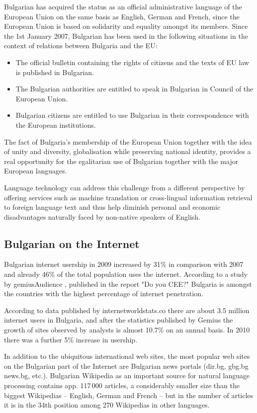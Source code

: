 \begin{multicols}{2}
Bulgarian has acquired the status as an official administrative language of the European Union on the same basis as English, German and French, since the European Union is based on solidarity and equality amongst its members. Since the 1st January 2007, Bulgarian has been used in the following situations in the context of relations between Bulgaria and the EU:
\begin{itemize}
\item The official bulletin containing the rights of citizens and the texts of EU law is published in Bulgarian.
\item The Bulgarian authorities are entitled to speak in Bulgarian in Council of the European Union.
\item Bulgarian citizens are entitled to use Bulgarian in their correspondence with the European institutions.
\end{itemize}

The fact of Bulgaria’s membership of the European Union together with the idea of unity and diversity, globalisation while preserving national identity, provides a real opportunity for the egalitarian use of Bulgarian together with the major European languages.

Language technology can address this challenge from a different perspective by offering services such as machine translation or cross-lingual information retrieval to foreign language text and thus help diminish personal and economic disadvantages naturally faced by non-native speakers of English.

\subsection{Bulgarian on the Internet}

Bulgarian internet usership in 2009 increased by 31\% in comparison with 2007 and already 46\% of the total population uses the internet. According to a study by gemiusAudience \cite{gemius}, published in the report "Do you CEE?" \cite{inetcee} Bulgaria is amongst the countries with the highest percentage of internet penetration.

According to data published by internetworldstats.co \cite{inetworldstat} there are about 3.5 million internet users in Bulgaria, and after the statistics published by Gemius the growth of sites observed by analysts is almost 10.7\% on an annual basis. In 2010 there was a further 5\% increase in usership.

In addition to the ubiquitous international web sites, the most popular web sites on the Bulgarian part of the Internet are Bulgarian news portals (dir.bg, gbg.bg news.bg, etc.). Bulgarian Wikipedia as an important source for natural language processing contains app. 117\,000 articles, a considerably smaller size than the biggest Wikipedias – English, German and French – but in the number of articles it is in the 34th position \cite{metadata} among 270 Wikipedias in other languages. 


\end{multicols}
